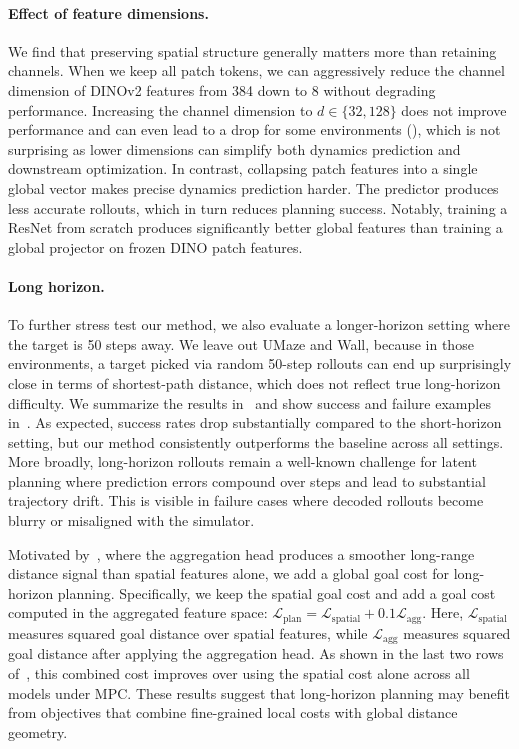 \paragraph{Effect of feature dimensions.} We find that preserving spatial structure generally matters more than retaining channels. When we keep all patch tokens, we can aggressively reduce the channel dimension of DINOv2 features from 384 down to 8 without degrading performance. Increasing the channel dimension to $d\in\{32, 128\}$ does not improve performance and can even lead to a drop for some environments (), which is not surprising as lower dimensions can simplify both dynamics prediction and downstream optimization. In contrast, collapsing patch features into a single global vector makes precise dynamics prediction harder. The predictor produces less accurate rollouts, which in turn reduces planning success. Notably, training a ResNet from scratch produces significantly better global features than training a global projector on frozen DINO patch features.

\paragraph{Long horizon.} To further stress test our method, we also evaluate a longer-horizon setting where the target is 50 steps away. We leave out UMaze and Wall, because in those environments, a target picked via random 50-step rollouts can end up surprisingly close in terms of shortest-path distance, which does not reflect true long-horizon difficulty. We summarize the results in~ and show success and failure examples in~. As expected, success rates drop substantially compared to the short-horizon setting, but our method consistently outperforms the baseline across all settings. More broadly, long-horizon rollouts remain a well-known challenge for latent planning where prediction errors compound over steps and lead to substantial trajectory drift. This is visible in failure cases where decoded rollouts become blurry or misaligned with the simulator.

Motivated by~, where the aggregation head produces a smoother long-range distance signal than spatial features alone, we add a global goal cost for long-horizon planning. Specifically, we keep the spatial goal cost and add a goal cost computed in the aggregated feature space: $\mathcal{L}_{\mathrm{plan}}=\mathcal{L}_{\mathrm{spatial}}+0.1\mathcal{L}_{\mathrm{agg}}$. Here, $\mathcal{L}_{\mathrm{spatial}}$ measures squared goal distance over spatial features, while $\mathcal{L}_{\mathrm{agg}}$ measures squared goal distance after applying the aggregation head. As shown in the last two rows of~, this combined cost improves over using the spatial cost alone across all models under MPC. These results suggest that long-horizon planning may benefit from objectives that combine fine-grained local costs with global distance geometry.

